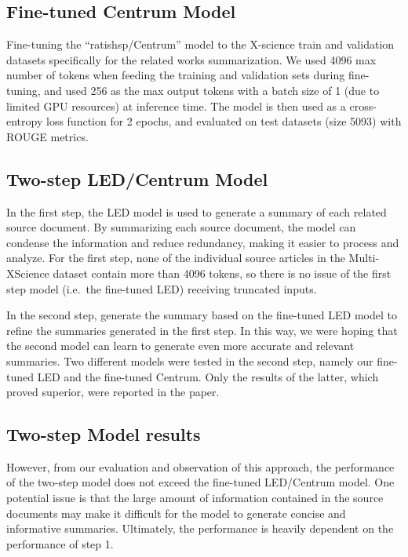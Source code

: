 \documentclass[12pt, twocolumn]{article}
\numberwithin{equation}{section}
\begin{document}
\subsection{Fine-tuned Centrum Model}
\label{app:model-ft-centrum}

Fine-tuning the ``ratishsp/Centrum'' model to the X-science train and validation datasets specifically for the related works summarization.  We used 4096 max number of tokens when feeding the training and validation sets during fine-tuning, and used 256 as the max output tokens with a batch size of 1 (due to limited GPU resources) at inference time. The model is then used as a cross-entropy loss function for 2 epochs, and evaluated on test datasets (size 5093) with ROUGE metrics.

\subsection{Two-step LED/Centrum Model}
\label{app:model-two-step-led}

In the first step, the LED model is used to generate a summary of each related source document. By summarizing each source document, the model can condense the information and reduce redundancy, making it easier to process and analyze. For the first step, none of the individual source articles in the Multi-XScience dataset contain more than 4096 tokens, so there is no issue of the first step model (i.e.~the fine-tuned LED) receiving truncated inputs.

In the second step, generate the summary based on the fine-tuned LED model to refine the summaries generated in the first step. In this way, we were hoping that the second model can learn to generate even more accurate and relevant summaries.  Two different models were tested in the second step, namely our fine-tuned LED and the fine-tuned Centrum.  Only the results of the latter, which proved superior, were reported in the paper.

\subsection{Two-step Model results}
\label{app:model-two-step-model-results}

However, from our evaluation and observation of this approach, the performance of the two-step model does not exceed the fine-tuned LED/Centrum model. One potential issue is that the large amount of information contained in the source documents may make it difficult for the model to generate concise and informative summaries. Ultimately, the performance is heavily dependent on the performance of step 1. 
\end{document}
